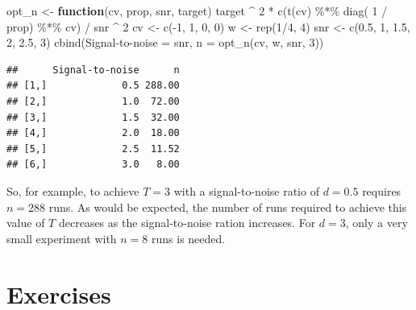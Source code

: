 \documentclass[
]{book}
\newenvironment{Shaded}{\begin{snugshade}}{\end{snugshade}}
\newcommand{\ControlFlowTok}[1]{\textcolor[rgb]{0.13,0.29,0.53}{\textbf{#1}}}
\newcommand{\DecValTok}[1]{\textcolor[rgb]{0.00,0.00,0.81}{#1}}
\newcommand{\FloatTok}[1]{\textcolor[rgb]{0.00,0.00,0.81}{#1}}
\newcommand{\FunctionTok}[1]{\textcolor[rgb]{0.00,0.00,0.00}{#1}}
\newcommand{\NormalTok}[1]{#1}
\newcommand{\OtherTok}[1]{\textcolor[rgb]{0.56,0.35,0.01}{#1}}
\newcommand{\SpecialCharTok}[1]{\textcolor[rgb]{0.00,0.00,0.00}{#1}}
\newcommand{\StringTok}[1]{\textcolor[rgb]{0.31,0.60,0.02}{#1}}
\theoremstyle{definition}
\theoremstyle{definition}
\theoremstyle{definition}
\theoremstyle{definition}
\theoremstyle{remark}
\begin{document}
\begin{Shaded}
\begin{Highlighting}[]
\NormalTok{opt\_n }\OtherTok{\textless{}{-}} \ControlFlowTok{function}\NormalTok{(cv, prop, snr, target) target }\SpecialCharTok{\^{}} \DecValTok{2} \SpecialCharTok{*} \FunctionTok{c}\NormalTok{(}\FunctionTok{t}\NormalTok{(cv) }\SpecialCharTok{\%*\%} \FunctionTok{diag}\NormalTok{( }\DecValTok{1} \SpecialCharTok{/}\NormalTok{ prop) }\SpecialCharTok{\%*\%}\NormalTok{ cv) }\SpecialCharTok{/}\NormalTok{ snr }\SpecialCharTok{\^{}} \DecValTok{2}
\NormalTok{cv }\OtherTok{\textless{}{-}} \FunctionTok{c}\NormalTok{(}\SpecialCharTok{{-}}\DecValTok{1}\NormalTok{, }\DecValTok{1}\NormalTok{, }\DecValTok{0}\NormalTok{, }\DecValTok{0}\NormalTok{)}
\NormalTok{w }\OtherTok{\textless{}{-}} \FunctionTok{rep}\NormalTok{(}\DecValTok{1}\SpecialCharTok{/}\DecValTok{4}\NormalTok{, }\DecValTok{4}\NormalTok{)}
\NormalTok{snr }\OtherTok{\textless{}{-}} \FunctionTok{c}\NormalTok{(}\FloatTok{0.5}\NormalTok{, }\DecValTok{1}\NormalTok{, }\FloatTok{1.5}\NormalTok{, }\DecValTok{2}\NormalTok{, }\FloatTok{2.5}\NormalTok{, }\DecValTok{3}\NormalTok{)}
\FunctionTok{cbind}\NormalTok{(}\StringTok{\textquotesingle{}Signal{-}to{-}noise\textquotesingle{}} \OtherTok{=}\NormalTok{ snr, }\StringTok{\textquotesingle{}n\textquotesingle{}} \OtherTok{=} \FunctionTok{opt\_n}\NormalTok{(cv, w, snr, }\DecValTok{3}\NormalTok{))}
\end{Highlighting}
\end{Shaded}

\begin{verbatim}
##      Signal-to-noise      n
## [1,]             0.5 288.00
## [2,]             1.0  72.00
## [3,]             1.5  32.00
## [4,]             2.0  18.00
## [5,]             2.5  11.52
## [6,]             3.0   8.00
\end{verbatim}

So, for example, to achieve \(T = 3\) with a signal-to-noise ratio of \(d=0.5\) requires \(n=288\) runs. As would be expected, the number of runs required to achieve this value of \(T\) decreases as the signal-to-noise ration increases. For \(d=3\), only a very small experiment with \(n=8\) runs is needed.

\hypertarget{exercises}{%
\section{Exercises}\label{exercises}}
\end{document}
